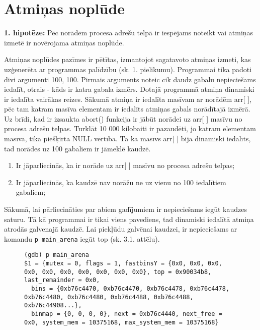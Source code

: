 ﻿
\section{Atmiņas noplūde}
 


\textbf{1. hipotēze:} Pēc norādēm procesa adrešu telpā ir iespējams noteikt vai atmiņas izmetē ir novērojama atmiņas noplūde.

Atmiņas noplūdes pazīmes ir pētītas, izmantojot sagatavoto atmiņas izmeti, kas uzģenerēta ar programmas palīdzību (sk. 1. pielikumu).
Programmai tika padoti divi argumenti 100, 100.
Pirmais arguments noteic cik daudz gabalu nepieciešams iedalīt, otrais - kāds ir katra gabala izmērs.
Dotajā programmā atmiņa dinamiski ir iedalīta vairākas reizes. 
Sākumā atmiņa ir iedalīta masīvam ar norādēm arr[ ], pēc tam katram masīva elementam ir iedalīts atmiņas gabals norādītajā izmērā.
Uz brīdi, kad ir izsaukta abort() funkcija ir jābūt norādei uz arr[ ] masīvu no procesa adrešu telpas.
Turklāt 10 000 kilobaiti ir pazaudēti, jo  katram elementam masīvā, tika piešķirta NULL vērtība. 
Tā kā masīvs arr[ ] bija dinamiski iedalīts, tad norādes uz 100 gabaliem ir jāmeklē kaudzē.
\begin{enumerate}
\item Ir jāparliecinās, ka ir norāde uz arr[ ] masīvu no procesa adrešu telpas;
\item Ir jāparliecinās, ka kaudzē nav norāžu ne uz vienu no 100 iedalītiem gabaliem;
\end{enumerate}
Sākumā, lai pārliecināties par abiem gadījumiem ir nepieciešams iegūt kaudzes saturu.
Tā kā programmai ir tikai viens pavediens, tad dinamiski iedalītā atmiņa atrodās galvenajā kaudzē.
Lai piekļūdu galvēnai kaudzei, ir nepieciešams ar komandu \texttt{p main\_arena} iegūt top (sk. 3.1. attēlu). 


\begin{figure}[h]
\begin{lstlisting}[style=customgdb]
(gdb) p main_arena
$1 = {mutex = 0, flags = 1, fastbinsY = {0x0, 0x0, 0x0, 0x0, 0x0, 0x0, 0x0, 0x0, 0x0, 0x0}, top = 0x90034b8, last_remainder = 0x0, 
  bins = {0xb76c4470, 0xb76c4470, 0xb76c4478, 0xb76c4478, 0xb76c4480, 0xb76c4480, 0xb76c4488, 0xb76c4488, 0xb76c44908...}, 
  binmap = {0, 0, 0, 0}, next = 0xb76c4440, next_free = 0x0, system_mem = 10375168, max_system_mem = 10375168}

\end{lstlisting}
\caption{\textbf{\fontsize{11}{12}\selectfont {Galvenās arēnas izdruka}}}
\end{figure}


